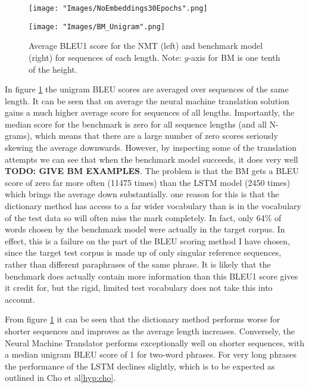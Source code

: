 \documentclass[]{article}
\begin{document}
\begin{figure}[h]
	\centering
	\begin{minipage}[b]{0.48\textwidth}
		\texttt{[image: "Images/NoEmbeddings30Epochs".png]}
	\end{minipage}
	\begin{minipage}[b]{0.48\textwidth}
		\texttt{[image: "Images/BM\_Unigram".png]}
	\end{minipage}
	\caption{Average BLEU1 score for the NMT (left) and benchmark model (right) for sequences of each length. Note: $y$-axis for BM is one tenth of the height.}
	\label{fig:per_sequence}
\end{figure}
In figure \ref{fig:per_sequence} the unigram BLEU scores are averaged over sequences of the same length. It can be seen that on average the neural machine translation solution gains a much higher average score for sequences of all lengths. Importantly, the median score for the benchmark is zero for all sequence lengths (and all N-grams), which means that there are a large number of zero scores seriously skewing the average downwards. However, by inspecting some of the translation attempts we can see that when the benchmark model succeeds, it does very well \textbf{TODO: GIVE BM EXAMPLES}. The problem is that the BM gets a BLEU score of zero far more often (11475 times) than the LSTM model (2450 times) which brings the average down substantially. one reason for this is that the dictionary method has access to a far wider vocabulary than is in the vocabulary of the test data so will often miss the mark completely. In fact, only 64\% of words chosen by the benchmark model were actually in the target corpus. In effect, this is a failure on the part of the BLEU scoring method I have chosen, since the target test corpus is made up of only singular reference sequences, rather than different paraphrases of the same phrase. It is likely that the benchmark does actually contain more information than this BLEU1 score gives it credit for, but the rigid, limited test vocabulary does not take this into account.

From figure \ref{fig:per_sequence} it can be seen that the dictionary method performs worse for shorter sequences and improves as the average length increases. Conversely, the Neural Machine Translator performs exceptionally well on shorter sequences, with a median unigram BLEU score of 1 for two-word phrases. For very long phrases the performance of the LSTM declines slightly, which is to be expected as outlined in Cho et al\ref{hyp:cho}.
\end{document}
